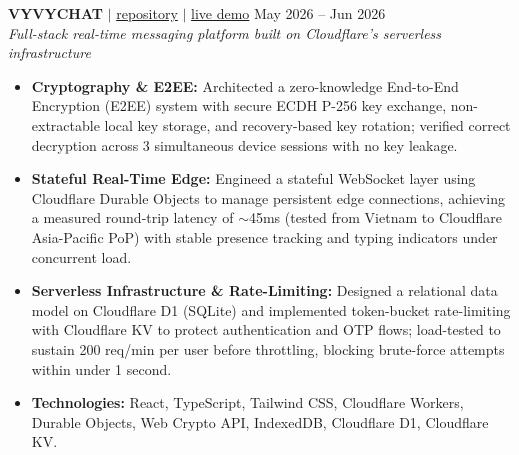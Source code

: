 \documentclass[10pt,a4paper]{article}
\begin{document}
\noindent \textbf{VYVYCHAT} $|$ \href{https://github.com/vyquochuy/vyvychat}{repository} $|$ \href{https://vyvychat.myvault-service.workers.dev/}{live demo} \hfill May 2026 -- Jun 2026\\
\textit{Full-stack real-time messaging platform built on Cloudflare's serverless infrastructure}
\begin{itemize}[leftmargin=0.25in, nosep]
    \item \textbf{Cryptography \& E2EE:} Architected a zero-knowledge End-to-End Encryption (E2EE) system with secure ECDH P-256 key exchange, non-extractable local key storage, and recovery-based key rotation; verified correct decryption across 3 simultaneous device sessions with no key leakage.
    \item \textbf{Stateful Real-Time Edge:} Engineed a stateful WebSocket layer using Cloudflare Durable Objects to manage persistent edge connections, achieving a measured round-trip latency of $\sim$45ms (tested from Vietnam to Cloudflare Asia-Pacific PoP) with stable presence tracking and typing indicators under concurrent load.
    \item \textbf{Serverless Infrastructure \& Rate-Limiting:} Designed a relational data model on Cloudflare D1 (SQLite) and implemented token-bucket rate-limiting with Cloudflare KV to protect authentication and OTP flows; load-tested to sustain 200 req/min per user before throttling, blocking brute-force attempts within under 1 second.
    \item \textbf{Technologies:} React, TypeScript, Tailwind CSS, Cloudflare Workers, Durable Objects, Web Crypto API, IndexedDB, Cloudflare D1, Cloudflare KV.
\end{itemize}
\vspace{10pt}
\end{document}
